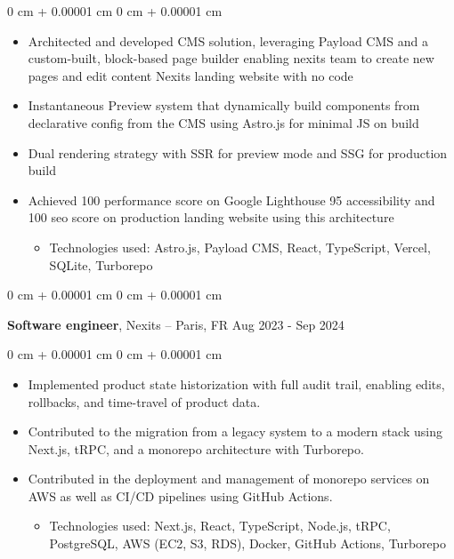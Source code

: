 \documentclass[10pt, letterpaper]{article}
\newenvironment{highlights}{
  \begin{itemize}[
    topsep=0.10 cm,
    parsep=0.10 cm,
    partopsep=0pt,
    itemsep=0pt,
    leftmargin=0 cm + 10pt
    ]
  }{
\end{itemize}
} %
\newenvironment{highlightsforbulletentries}{
  \begin{itemize}[
    topsep=0.10 cm,
    parsep=0.10 cm,
    partopsep=0pt,
    itemsep=0pt,
    leftmargin=10pt
    ]
  }{
\end{itemize}
} %
\newenvironment{onecolentry}{
  \begin{adjustwidth}{
      0 cm + 0.00001 cm
    }{
      0 cm + 0.00001 cm
    }
  }{
  \end{adjustwidth}
} %
\newenvironment{twocolentry}[2][]{
  \onecolentry
  \def\secondColumn{#2}
  \setcolumnwidth{\fill, 4.5 cm}
  \begin{paracol}{2}
  }{
    \switchcolumn \raggedleft \secondColumn
  \end{paracol}
  \endonecolentry
} %
\begin{document}
  \vspace{0.10 cm}
  \begin{onecolentry}
    \begin{highlights}
    \item Architected and developed CMS solution,
      leveraging Payload CMS and a custom-built, block-based page builder enabling nexits team to create new pages and edit content Nexits landing website with no code
    \item 
      Instantaneous Preview system that dynamically build components from declarative config from the CMS using Astro.js for minimal JS on build
    \item Dual rendering strategy with SSR for preview mode and SSG for production build
    \item Achieved 100 performance score on Google Lighthouse 95 accessibility and 100 seo score on production landing website using this architecture 

          \begin{highlightsforbulletentries}
    \item Technologies used: Astro.js, Payload CMS, React, TypeScript, Vercel, SQLite, Turborepo
    \end{highlightsforbulletentries}

    \end{highlights}

  \end{onecolentry}





  \begin{twocolentry}{
      Aug 2023 - Sep 2024
    }
  \textbf{Software engineer}, Nexits  -- Paris, FR\end{twocolentry}

  \vspace{0.10 cm}
  \begin{onecolentry}
    \begin{highlights}

    \item Implemented product state historization with full audit trail, enabling edits, rollbacks, and time-travel of product data.

    \item Contributed to the migration from a legacy system to a modern stack using Next.js, tRPC, and a monorepo architecture with Turborepo.

    \item Contributed in the deployment and management of monorepo services on AWS as well as CI/CD pipelines using GitHub Actions.

                \begin{highlightsforbulletentries}
    \item Technologies used: Next.js, React, TypeScript, Node.js, tRPC, PostgreSQL, AWS (EC2, S3, RDS), Docker, GitHub Actions, Turborepo
    \end{highlightsforbulletentries}


    \end{highlights}

  \end{onecolentry}
\end{document}
